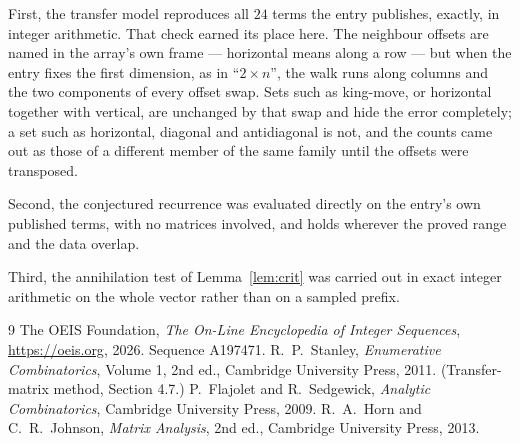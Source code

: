 \documentclass[11pt,a4paper]{article}
\theoremstyle{plain}
\theoremstyle{definition}
\begin{document}
First, the transfer model reproduces all $24$ terms the entry publishes, exactly, in
integer arithmetic. That check earned its place here. The neighbour offsets are named in the
array's own frame --- horizontal means along a row --- but when the entry fixes the first
dimension, as in ``$2\times n$'', the walk runs along columns and the two components of every
offset swap. Sets such as king-move, or horizontal together with vertical, are unchanged by
that swap and hide the error completely; a set such as horizontal, diagonal and antidiagonal
is not, and the counts came out as those of a different member of the same family until the
offsets were transposed.

Second, the conjectured recurrence was evaluated directly on the entry's own published terms,
with no matrices involved, and holds wherever the proved range and the data overlap.

Third, the annihilation test of Lemma~\ref{lem:crit} was carried out in exact integer
arithmetic on the whole vector rather than on a sampled prefix.

\begin{thebibliography}{9}
 The OEIS Foundation, \emph{The On-Line Encyclopedia of Integer
Sequences}, \url{https://oeis.org}, 2026. Sequence A197471.
 R.~P.~Stanley, \emph{Enumerative Combinatorics}, Volume 1, 2nd ed.,
Cambridge University Press, 2011. (Transfer-matrix method, Section 4.7.)
 P.~Flajolet and R.~Sedgewick, \emph{Analytic Combinatorics}, Cambridge
University Press, 2009.
 R.~A.~Horn and C.~R.~Johnson, \emph{Matrix Analysis}, 2nd ed., Cambridge
University Press, 2013.
\end{thebibliography}
\end{document}
